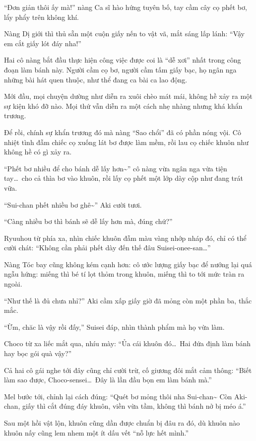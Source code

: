 \documentclass[../main.tex]{subfiles}
\begin{document}
``Đơn giản thôi ấy mà!'' nàng Ca sĩ hào hứng tuyên bố, tay cầm cây cọ phết bơ, lẩy phẩy trên không khí.

Nàng Dị giới thì thủ sẵn một cuộn giấy nến to vật vã, mắt sáng lấp lánh: ``Vậy em cắt giấy lót đáy nha!''

Hai cô nàng bắt đầu thực hiện công việc được coi là ``dễ xơi'' nhất trong công đoạn làm bánh này. Người cầm cọ bơ, người cầm tấm giấy bạc, họ ngân nga những bài hát quen thuộc, như thể đang ca bài ca lao động.

Mới đầu, mọi chuyện dường như diễn ra xuôi chèo mát mái, không hề xảy ra một sự kiện khó đỡ nào. Mọi thứ vẫn diễn ra một cách nhẹ nhàng nhưng khá khẩn trương.

Để rồi, chính sự khẩn trương đó mà nàng ``Sao chổi'' đã có phần nóng vội. Cô nhiệt tình đẫm chiếc cọ xuống lát bơ được làm mềm, rồi lau cọ chiếc khuôn như không hề có gì xảy ra.

``Phết bơ nhiều để cho bánh dễ lấy hơn\~{}'' cô nàng vừa ngân nga vừa tiện tay\dots\ cho cả thìa bơ vào khuôn, rồi lấy cọ phết một lớp dày cộp như đang trát vữa.

``Sui-chan phết nhiều bơ ghê\~{}'' Aki cười tươi.

``Càng nhiều bơ thì bánh sẽ dễ lấy hơn mà, đúng chứ?''

Ryuuhou từ phía xa, nhìn chiếc khuôn đẫm màu vàng nhớp nháp đó, chỉ có thể cười chát: ``Không cần phải phết dày đến thế đâu Suisei-onee-san\dots''

Nàng Tóc bay cũng không kém cạnh hơn: cô ước lượng giấy bạc để nướng lại quá ngẫu hứng: miếng thì bé tí lọt thỏm trong khuôn, miếng thì to tới mức tràn ra ngoài.

``Như thế là đủ chưa nhỉ?'' Aki cầm xấp giấy giờ đã mỏng còn một phần ba, thắc mắc.

``Ừm, chăc là vậy rồi đấy,'' Suisei đáp, nhìn thành phẩm mà họ vừa làm.

Choco từ xa liếc mắt qua, nhíu mày: ``Ủa cái khuôn đó\dots\ Hai đứa định làm bánh hay bọc gói quà vậy?''

Cả hai cô gái nghe tới đây cũng chỉ cười trừ, cố giương đôi mắt cảm thông: ``Biết làm sao được, Choco-sensei\dots\ Đây là lần đầu bọn em làm bánh mà.''

Mel bước tới, chỉnh lại cách đúng: ``Quét bơ mỏng thôi nha Sui-chan\~{} Còn Aki-chan, giấy thì cắt đúng đáy khuôn, viền vừa tầm, không thì bánh nở bị méo á.''

Sau một hồi vật lộn, khuôn cũng dần được chuẩn bị đâu ra đó, dù khuôn nào khuôn nấy cũng lem nhem một ít dấu vết ``nỗ lực hết mình.''
\end{document}
